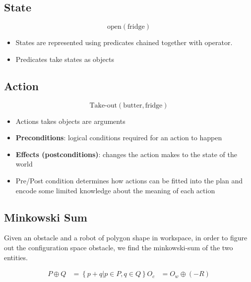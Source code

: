 \subsection{State}

  \begin{equation}
    \text{open}\left( \text{fridge} \right)
  \end{equation}

  \begin{itemize}
    \item States are represented using predicates chained together with operator.
    \item Predicates take states as objects
  \end{itemize}

\subsection{Action}

  \begin{equation}
    \text{Take-out}\left( \text{butter}, \text{fridge} \right)
  \end{equation}

  \begin{itemize}
    \item Actions takes objects are arguments
    \item \textbf{Preconditions}: logical conditions required for an action
    to happen
    \item \textbf{Effects (postconditions)}: changes the action makes to the
    state of the world
    \item Pre/Post condition determines how actions can be fitted into the
    plan and encode some limited knowledge about the meaning of each action
  \end{itemize}

\subsection{Minkowski Sum}

  Given an obstacle and a robot of polygon shape in workspace, in order to
  figure out the configuration space obstacle, we find the \gls{minkowski-sum}
  of the two entities.

  \begin{align}
    P \oplus Q &= \left\{ p + q | p \in P, q \in Q \right\}
    O_{c} &= O_{w} \oplus \left( -R \right)
  \end{align}

